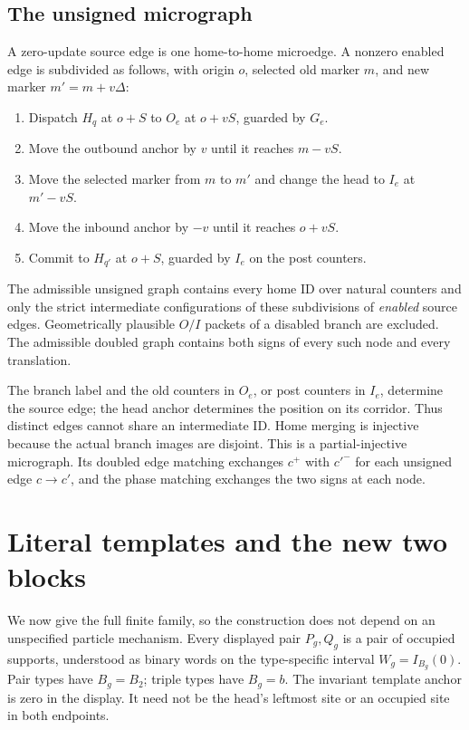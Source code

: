 \documentclass[11pt,a4paper]{article}
\numberwithin{equation}{section}
\begin{document}
\subsection{The unsigned micrograph}
A zero-update source edge is one home-to-home microedge. A nonzero enabled edge is subdivided as follows, with origin $o$, selected old marker $m$, and new marker $m'=m+v\Delta$:
\begin{enumerate}
\item Dispatch $H_q$ at $o+S$ to $O_e$ at $o+vS$, guarded by $G_e$.
\item Move the outbound anchor by $v$ until it reaches $m-vS$.
\item Move the selected marker from $m$ to $m'$ and change the head to $I_e$ at $m'-vS$.
\item Move the inbound anchor by $-v$ until it reaches $o+vS$.
\item Commit to $H_{q'}$ at $o+S$, guarded by $I_e$ on the post counters.
\end{enumerate}
The admissible unsigned graph contains every home ID over natural counters and only the strict intermediate configurations of these subdivisions of \emph{enabled} source edges. Geometrically plausible $O/I$ packets of a disabled branch are excluded. The admissible doubled graph contains both signs of every such node and every translation.

The branch label and the old counters in $O_e$, or post counters in $I_e$, determine the source edge; the head anchor determines the position on its corridor. Thus distinct edges cannot share an intermediate ID. Home merging is injective because the actual branch images are disjoint. This is a partial-injective micrograph. Its doubled edge matching exchanges $c^+$ with $c'^-$ for each unsigned edge $c\to c'$, and the phase matching exchanges the two signs at each node.

\section{Literal templates and the new two blocks}\label{fpa:pi:sec:templates}
We now give the full finite family, so the construction does not depend on an unspecified particle mechanism. Every displayed pair $P_g,Q_g$ is a pair of occupied supports, understood as binary words on the type-specific interval $W_g=I_{B_g}(0)$. Pair types have $B_g=B_2$; triple types have $B_g=b$. The invariant template anchor is zero in the display. It need not be the head's leftmost site or an occupied site in both endpoints.
\end{document}
